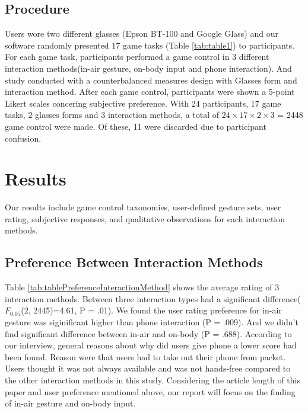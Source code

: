 \documentclass{sigchi}
\begin{document}
    \subsection {Procedure}
    Users wore two different glasses (Epson BT-100 and Google Glass) and our software randomly presented 17 game tasks (Table \ref{tab:table1}) to participants. For each game task, participants performed a game control in 3 different interaction methods(in-air gesture, on-body input and phone interaction). And study conducted with a counterbalanced measures design with Glasses form and interaction method. After each game control, participants were shown a 5-point Likert scales concering subjective preference. With 24 participants, 17 game tasks, 2 glasses forms and 3 interaction methods, a total of $24 \times 17 \times 2 \times 3$ = 2448 game control were made. Of these, 11 were discarded due to participant confusion. 

\section{Results}

Our results include game control taxonomies, user-defined gesture sets, user rating, subjective responses, and qualitative observations for each interaction methods.

  \subsection{Preference Between Interaction Methods}
  Table \ref{tab:tablePreferenceInteractionMethod} shows the average rating of 3 interaction methods. Between three interaction types had a significant difference($F_{0.05}$(2, 2445)=4.61, P = .01). We found the user rating preference for in-air gesture was siginificant higher than phone interaction (P = .009). And we didn't find significant difference between in-air and on-body (P = .688).
  According to our interview, general reasons about why did users give phone a lower score had been found. Reason were that users had to take out their phone from packet. Users thought it was not always available and was not hands-free compared to the other interaction methods in this study. Considering the article length of this paper and user preference mentioned above, our report will focus on the finding of in-air gesture and on-body input.
\end{document}
